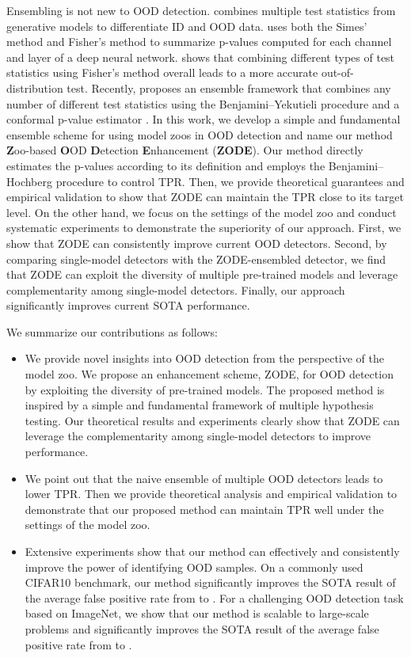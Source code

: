 \documentclass{article} \usepackage{iclr2023_conference,times}
\begin{document}
Ensembling is not new to OOD detection.
\cite{morningstar2021density} combines multiple test statistics from generative models to differentiate ID and OOD data.
\cite{haroush2021statistical} uses both the Simes' method and Fisher's method to summarize p-values computed for each channel and layer of a deep neural network.
\cite{bergamin2022model} shows that combining different types of test statistics using Fisher’s method overall leads to a more accurate out-of-distribution test.
Recently, \cite{magesh2022multiple} proposes an ensemble framework that combines any number of different test statistics using the Benjamini–Yekutieli procedure \citep{benjamini2001control} and a conformal p-value estimator \citep{vovk1999machine}.
In this work, we develop a simple and fundamental ensemble scheme for using model zoos in OOD detection and name our method {\bf Z}oo-based {\bf O}OD {\bf D}etection {\bf E}nhancement ({\bf ZODE}).
Our method directly estimates the p-values according to its definition and employs the Benjamini–Hochberg procedure \citep{benjamini1995controlling} to control TPR.
Then, we provide theoretical guarantees and empirical validation to show that ZODE can maintain the TPR close to its target level. 
On the other hand, we focus on the settings of the model zoo and conduct systematic experiments to demonstrate the superiority of our approach.
First, we show that ZODE can consistently improve current OOD detectors. 
Second, by comparing single-model detectors with the ZODE-ensembled detector, we find that ZODE can exploit the diversity of multiple pre-trained models and leverage complementarity among single-model detectors.
Finally, our approach significantly improves current SOTA performance. 


We summarize our contributions as follows:
\begin{itemize}
\item[] 
We provide novel insights into OOD detection from the perspective of the model zoo. 
We propose an enhancement scheme, ZODE, for OOD detection by exploiting the diversity of pre-trained models.
The proposed method is inspired by a simple and fundamental framework of multiple hypothesis testing. Our theoretical results and experiments clearly show that ZODE can leverage the complementarity among single-model detectors to improve performance.
\item[] We point out that the naive ensemble of multiple OOD detectors leads to lower TPR. Then we provide theoretical analysis and empirical validation to demonstrate that our proposed method can maintain TPR well under the settings of the model zoo.
\item[] Extensive experiments show that our method can effectively and consistently improve the power of identifying OOD samples.
On a commonly used CIFAR10 benchmark, our method significantly improves the SOTA result of the average false positive rate from  to . 
For a challenging OOD detection task based on ImageNet, we show that our method is scalable to large-scale problems and significantly improves the SOTA result of the average false positive rate from  to . 
\end{itemize}
\end{document}
